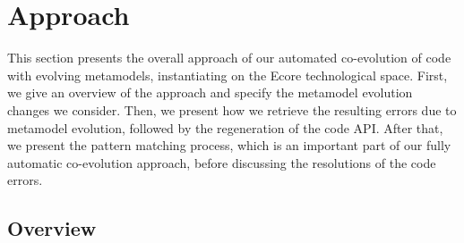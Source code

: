 \section{Approach}\label{approach}

This section presents the overall approach of our automated co-evolution of code with evolving metamodels,  instantiating on the Ecore technological space. First, we give an overview of the approach and specify the metamodel evolution changes we consider. 
%
Then, we present how we retrieve the resulting errors due to metamodel evolution, followed by the regeneration of the code API. 
After that, we present the pattern matching process, which is an important part of our fully automatic co-evolution approach, before discussing the resolutions of the code errors. 

\subsection{Overview}
\label{Overview}

